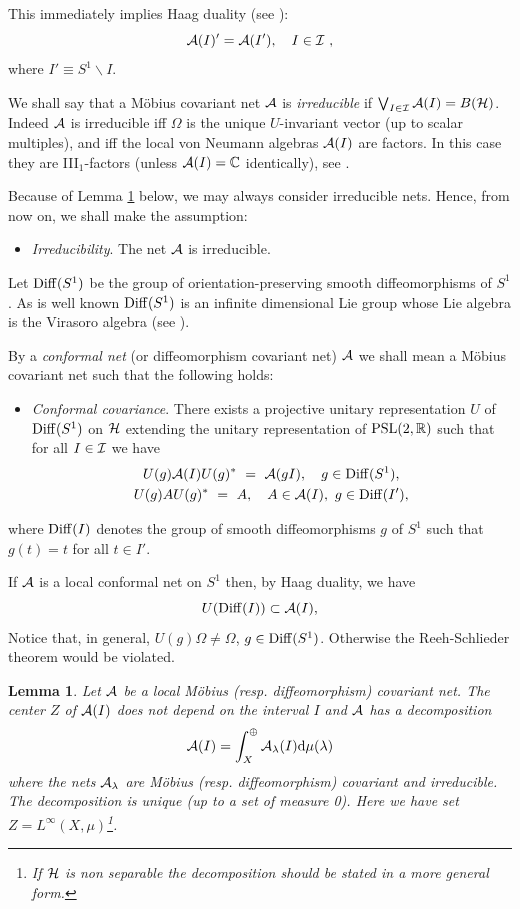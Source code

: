 \documentclass[12pt]{article}
\def\Diff{{\rm Diff}}
\def\Om{\Omega}
\newtheorem{lemma}[theorem]{Lemma}
\def\setminus{\smallsetminus}
\def\PSL{{{\rm PSL}(2,\mathbb R)}}
\def\A{{\cal A}}
\def\I{{\cal I}}
\def\H{{\cal H}}
\def\C{{\mathbb C}}
\begin{document}
This immediately implies Haag duality (see \cite{HL,BS}): 
$$
\A(I)'=\A(I'),\quad I\in\I\ ,
$$
where $I'\equiv S^1\setminus I$.

We shall say that a M\"{o}bius covariant net $\A$ is {\it irreducible} if 
$\bigvee_{I\in\I}\A(I)=B(\H)$. Indeed $\A$ is irreducible iff
$\Om$ is the unique $U$-invariant vector (up to scalar multiples), and 
iff the local von Neumann 
algebras $\A(I)$ are factors. In this case they are III$_1$-factors 
(unless $\A(I)=\C$ identically), see \cite{GL2}.

Because of Lemma \ref{irr} below,
we may always consider irreducible nets. Hence, 
from now on, we shall make the assumption:

\begin{itemize}
\item[{\bf F.}] {\it Irreducibility}. The net $\A$ is irreducible.
\end{itemize}
Let $\Diff(S^1)$ be the group of orientation-preserving smooth 
diffeomorphisms of $S^1$. As is well known $\Diff(S^1)$ is an infinite 
dimensional Lie group whose Lie algebra is the Virasoro algebra (see 
\cite{PS,KR}).

By a {\it conformal net} (or diffeomorphism covariant 
net)  $\A$ we shall mean a M\"{o}bius covariant 
net such that the following holds:
\begin{itemize}
\item[{\bf G.}] {\it Conformal covariance}. There exists a projective unitary 
representation $U$ of $\Diff(S^1)$ on $\H$ extending the unitary 
representation of $\PSL$ such that for all $I\in\I$ we have
\begin{gather*}
 U(g)\A(I) U(g)^*\ =\ \A(gI),\quad  g\in\Diff(S^1), \\
 U(g)AU(g)^*\ =\ A,\quad A\in\A(I),\ g\in\Diff(I'),
\end{gather*}
\end{itemize}
where $\Diff(I)$ denotes the group of 
smooth diffeomorphisms $g$ of $S^1$ such that $g(t)=t$ for all $t\in I'$.

If $\A$ is a local conformal net on $S^1$ then, by Haag duality, we have 
\[
U(\Diff(I))\subset\A(I),
\]
Notice that, in general, $U(g)\Om\neq\Om$,  $g\in\Diff(S^1) $. 
Otherwise the Reeh-Schlieder theorem would be violated.
\begin{lemma}\label{irr}
Let $\A$ be a local M\"{o}bius (resp. diffeomorphism) covariant net. 
The center $Z$ of $\A(I)$ 
does not depend on the interval $I$ and $\A$ has a decomposition
\[
\A(I) =\int_{X}^{\oplus}\A_{\lambda}(I)\text{d}\mu(\lambda)
\]
where the nets $\A_{\lambda}$ are M\"{o}bius (resp. diffeomorphism) 
covariant and irreducible. The decomposition is 
unique (up to a set of measure 0). Here we have set 
$Z=L^{\infty}(X,\mu)$\footnote{If $\H$ is non separable the 
decomposition should be stated in a more general form.}.
\end{lemma}
\end{document}
